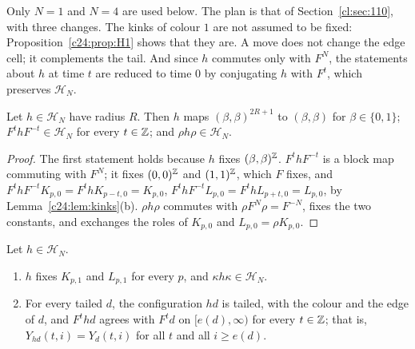 Only $N=1$ and $N=4$ are used below. The plan is that of Section~\ref{cl:sec:110}, with three changes. The kinks of colour $1$ are not assumed to be fixed: Proposition~\ref{c24:prop:H1} shows that they are. A move does not change the edge cell; it complements the tail. And since $h$ commutes only with $F^N$, the statements about $h$ at time $t$ are reduced to time $0$ by conjugating $h$ with $F^t$, which preserves $\mathcal H_N$.

\begin{lemma}\label{c24:lem:Hclosed}
Let $h\in\mathcal H_N$ have radius $R$. Then $h$ maps $(\beta,\beta)^{2R+1}$ to $(\beta,\beta)$ for $\beta\in\{0,1\}$; $F^thF^{-t}\in\mathcal H_N$ for every $t\in\mathbb{Z}$; and $\rho h\rho\in\mathcal H_N$.
\end{lemma}

\begin{proof}
The first statement holds because $h$ fixes $(\beta,\beta)^{\mathbb{Z}}$. $F^thF^{-t}$ is a block map commuting with $F^N$; it fixes $(0,0)^{\mathbb{Z}}$ and $(1,1)^{\mathbb{Z}}$, which $F$ fixes, and $F^thF^{-t}K_{p,0}=F^thK_{p-t,0}=K_{p,0}$, $F^thF^{-t}L_{p,0}=F^thL_{p+t,0}=L_{p,0}$, by Lemma~\ref{c24:lem:kinks}(b). $\rho h\rho$ commutes with $\rho F^N\rho=F^{-N}$, fixes the two constants, and exchanges the roles of $K_{p,0}$ and $L_{p,0}=\rho K_{p,0}$.
\end{proof}

\begin{proposition}\label{c24:prop:H1}
Let $h\in\mathcal H_N$.
\begin{enumerate}
\item[(a)] $h$ fixes $K_{p,1}$ and $L_{p,1}$ for every $p$, and $\kappa h\kappa\in\mathcal H_N$.
\item[(b)] For every tailed $d$, the configuration $hd$ is tailed, with the colour and the edge of $d$, and $F^thd$ agrees with $F^td$ on $[e(d),\infty)$ for every $t\in\mathbb{Z}$; that is, $Y_{hd}(t,i)=Y_d(t,i)$ for all $t$ and all $i\ge e(d)$.
\end{enumerate}
\end{proposition}

